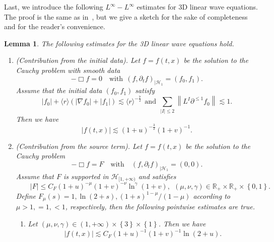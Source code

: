 \documentclass[a4paper,reqno]{amsart}
\newtheorem{lemma}[theorem]{Lemma}
\theoremstyle{definition}
\numberwithin{equation}{section}
\def \pt{\partial_{t}}
\begin{document}
Last, we introduce the following $L^{\infty}-L^{\infty}$ estimates for 3D linear wave equations. The proof is the same as in~\cite[Proposition 3.1]{AlinhacIndiana}, but we give a sketch for the sake of completeness and for the reader’s convenience. 
 \begin{lemma}\label{le:Linfty}
 The following estimates for the 3D linear wave equations hold.
 \begin{enumerate}
     \item \emph{({Contribution from the initial data}).}
     Let $f=f(t,x)$ be the solution to the Cauchy problem with smooth data
  \begin{equation}\label{equ:waveinitial}
     -\Box f=0\quad \mbox{with}\ \ (f,\pt f)_{|\mathcal{H}_{1}}=(f_{0},f_{1}).
 \end{equation}
Assume that the initial data $(f_{0},f_{1})$ satisfy
\begin{equation}\label{est:smallinitial}
    |f_{0}|+\langle r\rangle\left(|\nabla f_{0}|+|f_{1}|\right)\lesssim {}\langle  r\rangle^{-\frac{7}{2}} \ \ \mbox{and}\ \ 
    \sum_{|I|\le 2}\left\|L^{I}\partial^{\leq 1} f_0\right\|\lesssim 1.
\end{equation}
 Then we have 
 \begin{equation*}
     |f(t,x)|\lesssim (1+u)^{-\frac{3}{2}}(1+v)^{-1}.
 \end{equation*}

\item \emph{({Contribution from the source term}).}
Let $f=f(t,x)$ be the solution to the Cauchy problem
	\begin{equation}\label{equ:wavesource}
	-\Box f=F\quad \mbox{with}\quad (f,\pt f)_{|\mathcal{H}_{1}}=(0,0).
    \end{equation}
	Assume that $F$ is supported in $\mathcal{H}_{[1,+\infty)}$ and satisfies
	\begin{equation*}
	\qquad |F|\le C_{F} (1+u)^{-\mu}(1+v)^{-\nu} \ln^{\gamma} (1+v),\ \  (\mu, \nu, \gamma)\in \mathbb{R}_{+}\times \mathbb{R}_+\times \left\{0,1\right\}.
	\end{equation*}
	Define $F_{\mu}(s)=1,\ln (2+s), (1+s)^{1-\mu}/(1-\mu)$ according to $\mu >1,=1,<1$, respectively, then the following pointwise estimates are true.
	\begin{enumerate}

     \item [\emph{(a)}]  Let $(\mu,\nu,\gamma)\in (1,+\infty)\times \left\{3\right\}\times \left\{1\right\}$. Then we have 
		\begin{equation*}
		|f(t,x)|\lesssim C_{F}(1+u)^{-1}(1+v)^{-1}\ln (2+u).
		\end{equation*}
		

\end{enumerate}
\end{enumerate}
\end{lemma}
\end{document}
